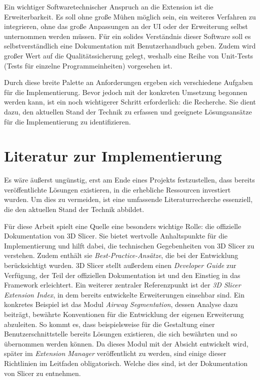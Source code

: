 Ein wichtiger Softwaretechnischer Anspruch an die Extension ist die
Erweiterbarkeit. Es soll ohne große Mühen möglich sein, ein weiteres Verfahren
zu integrieren, ohne das große Anpassungen an der \ac{UI} oder der Erweiterung
selbst unternommen werden müssen. Für ein solides Verständnis dieser Software soll
es selbstverständlich eine Dokumentation mit Benutzerhandbuch geben. Zudem wird
großer Wert auf die Qualitätssicherung gelegt, weshalb eine Reihe von Unit-Tests
(Tests für einzelne Programmeinheiten) vorgesehen ist.

Durch diese breite Palette an Anforderungen ergeben sich verschiedene Aufgaben für
die Implementierung. Bevor jedoch mit der konkreten Umsetzung begonnen werden
kann, ist ein noch wichtigerer Schritt erforderlich: die Recherche. Sie dient dazu,
den aktuellen Stand der Technik zu erfassen und geeignete Lösungsansätze für die
Implementierung zu identifizieren.

\section{Literatur zur Implementierung}
Es wäre äußerst ungünstig, erst am Ende eines Projekts festzustellen, dass
bereits veröffentlichte Lösungen existieren, in die erhebliche Ressourcen investiert
wurden. Um dies zu vermeiden, ist eine umfassende Literaturrecherche essenziell,
die den aktuellen Stand der Technik abbildet.

Für diese Arbeit spielt eine Quelle eine besonders wichtige Rolle: die offizielle
Dokumentation von 3D Slicer. Sie bietet wertvolle Anhaltspunkte für die
Implementierung und hilft dabei, die technischen Gegebenheiten von 3D Slicer zu verstehen.
Zudem enthält sie \textit{Best-Practice-Ansätze}, die bei der Entwicklung
berücksichtigt wurden. 3D Slicer stellt außerdem einen \textit{Developer Guide}
zur Verfügung, der Teil der offiziellen Dokumentation ist und den Einstieg in das
Framework erleichtert. Ein weiterer zentraler Referenzpunkt ist der \textit{3D
Slicer Extension Index}, in dem bereits entwickelte Erweiterungen einsehbar sind.
Ein konkretes Beispiel ist das Modul \textit{Airway Segmentation}, dessen Analyse
dazu beiträgt, bewährte Konventionen für die Entwicklung der eigenen Erweiterung
abzuleiten. So kommt es, dass beispielsweise für die Gestaltung einer
Benutzerschnittstelle bereits Lösungen existieren, die sich bewährten und so übernommen
werden können. Da dieses Modul mit der Absicht entwickelt wird, später im \textit{Extension
Manager} veröffentlicht zu werden, sind einige dieser Richtlinien im Leitfaden obligatorisch.
Welche dies sind, ist der Dokumentation von Slicer zu entnehmen.


